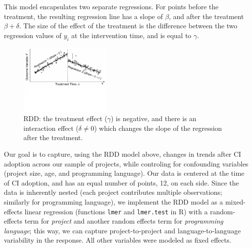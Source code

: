 
This model encapsulates two separate regressions.
For points before the treatment, the resulting regression line has a slope of 
$\beta$, and after the treatment $\beta + \delta$.
The size of the effect of the treatment is the difference between the two 
regression values of $y_i$ at the intervention time,
and is equal to $\gamma$.

\begin{figure}[t]
	\centering
	\includegraphics[width=0.4\textwidth, clip=true, trim=0 250 0 0]{figures/rdd.pdf}
	\caption{RDD: the treatment effect ($\gamma$) 
is negative, and there is an interaction effect ($\delta \neq 0$) which changes 
the slope of the regression after the treatment.}\vspace{-0.4cm}
	\label{RDDIllustration}
\end{figure}

Our goal is to capture, using the RDD model above, changes in trends after CI 
adoption across our sample of projects, while controling for confounding variables 
(\eg project size, age, and programming language).
Our data is centered at the time of CI adoption, and has an equal number of points, 
12, on each side.
Since the data is inherently nested (each project contributes multiple observations; 
similarly for programming language), we implement the RDD model as a 
mixed-effects linear regression (functions \texttt{lmer} and \texttt{lmer.test} in R) 
with a random-effects term for \emph{project} and another random effects term 
for \emph{programming language}; this way, we can capture project-to-project and 
language-to-language variability in the response.
All other variables were modeled as fixed effects.

